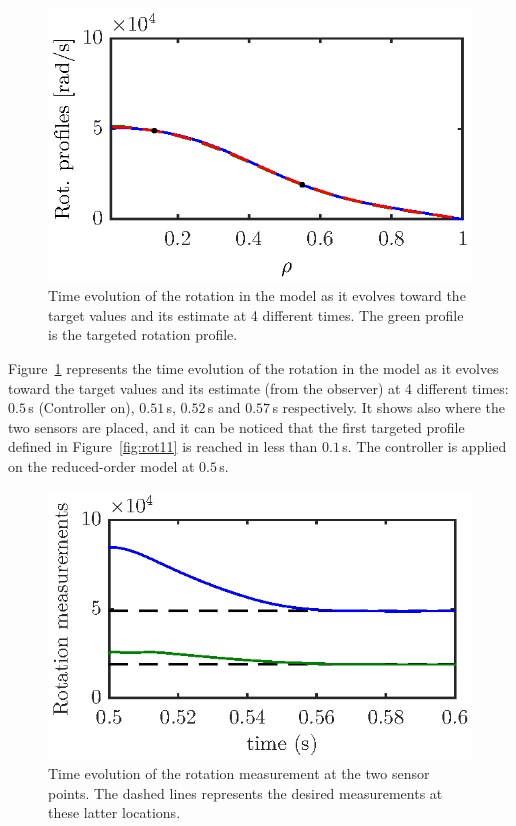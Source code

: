 \documentclass{iopart}
\begin{document}
\begin{figure}
	\includegraphics{imene_figs/fig13d} %
	\caption{Time evolution of the rotation in the model as it evolves toward the target values and its estimate at 4 different times. The green profile is the targeted rotation profile. }
	\label{fig:rot18}
\end{figure}


Figure~\ref{fig:rot18} represents the time evolution of the rotation in the model as it evolves toward the target values and its estimate (from the observer) at 4 different times: $0.5$\,s (Controller on), $0.51$\,s, $0.52$\,s and $0.57$\,s respectively. It shows also where the two sensors are placed, and it can be noticed that the first targeted profile defined in Figure~\ref{fig:rot11} is reached in less than $0.1$\,s. The controller is applied on the reduced-order model at $0.5$\,s.
\begin{figure}
\centering
\includegraphics{imene_figs/fig14} %
\caption{Time evolution of the rotation measurement at the two sensor points. The dashed lines represents the desired measurements at these latter locations. }
\label{fig:rot20}
\end{figure}    
\end{document}
